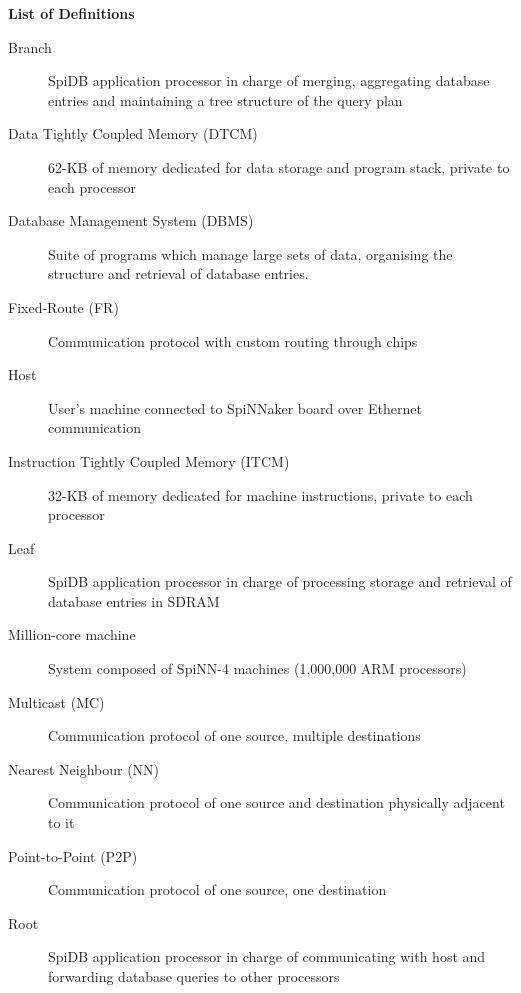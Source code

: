 \vspace*{1.2cm}
{ \huge \bfseries List of Definitions}
\vspace{7mm}

\small
\begin{description}

  \item[Branch] SpiDB application processor in charge of merging, aggregating database entries and maintaining a tree structure of the query plan

  \item[Data Tightly Coupled Memory (DTCM)] 62-KB of memory dedicated for data storage and program stack, private to each processor
  
  \item[Database Management System (DBMS)] Suite of programs which manage large sets of data, organising the structure and retrieval of database entries.\cite{dbmsdef}
   
  \item[Fixed-Route (FR)] Communication protocol with custom routing through chips   
    
  \item[Host] User's machine connected to SpiNNaker board over Ethernet communication    
    
  \item[Instruction Tightly Coupled Memory (ITCM)] 32-KB of memory dedicated for machine instructions, private to each processor    
    
  \item[Leaf] SpiDB application processor in charge of processing storage and retrieval of database entries in SDRAM    
    
  \item[Million-core machine] System composed of  SpiNN-4 machines (1,000,000 ARM processors)   
  
  \item[Multicast (MC)] Communication protocol of one source, multiple destinations    

  \item[Nearest Neighbour (NN)] Communication protocol of one source and destination physically adjacent to it

  \item[Point-to-Point (P2P)] Communication protocol of one source, one destination    
  
  \item[Root] SpiDB application processor in charge of communicating with host and forwarding database queries to other processors
  

\end{description}
